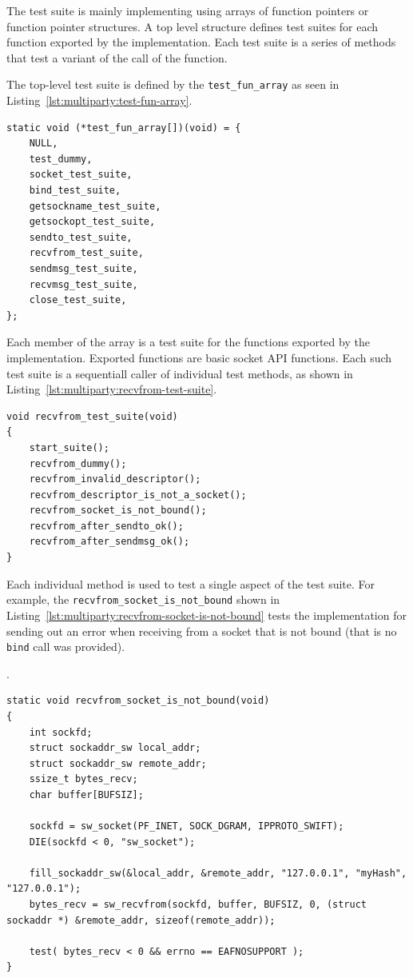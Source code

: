 The test suite is mainly implementing using arrays of function pointers or
function pointer structures. A top level structure defines test suites for
each function exported by the implementation. Each test suite is a series of
methods that test a variant of the call of the function.

The top-level test suite is defined by the \texttt{test\_fun\_array} as seen
in Listing~\ref{lst:multiparty:test-fun-array}.

\lstset{language=C,caption=Test Suite Top-Level
Array,label=lst:multiparty:test-fun-array}
\begin{lstlisting}
static void (*test_fun_array[])(void) = {
    NULL,
    test_dummy,
    socket_test_suite,
    bind_test_suite,
    getsockname_test_suite,
    getsockopt_test_suite,
    sendto_test_suite,
    recvfrom_test_suite,
    sendmsg_test_suite,
    recvmsg_test_suite,
    close_test_suite,
};
\end{lstlisting}

Each member of the array is a test suite for the functions exported by the
implementation. Exported functions are basic socket API functions. Each such
test suite is a sequentiall caller of individual test methods, as shown in
Listing~\ref{lst:multiparty:recvfrom-test-suite}.

\lstset{language=C,caption=Test Suite for recvfrom Call,label=lst:multiparty:recvfrom-test-suite}
\begin{lstlisting}
void recvfrom_test_suite(void)
{
    start_suite();
    recvfrom_dummy();
    recvfrom_invalid_descriptor();
    recvfrom_descriptor_is_not_a_socket();
    recvfrom_socket_is_not_bound();
    recvfrom_after_sendto_ok();
    recvfrom_after_sendmsg_ok();
}
\end{lstlisting}

Each individual method is used to test a single aspect of the test suite. For
example, the \texttt{recvfrom\_socket\_is\_not\_bound} shown in
Listing~\ref{lst:multiparty:recvfrom-socket-is-not-bound} tests the
implementation for sending out an error when receiving from a socket that is
not bound (that is no \texttt{bind} call was provided).

\lstset{language=C,caption=Basic Method for Testing recvfrom
Call,label=lst:multiparty:recvfrom-socket-is-not-bound}.
\begin{lstlisting}
static void recvfrom_socket_is_not_bound(void)
{
    int sockfd;
    struct sockaddr_sw local_addr;
    struct sockaddr_sw remote_addr;
    ssize_t bytes_recv;
    char buffer[BUFSIZ];

    sockfd = sw_socket(PF_INET, SOCK_DGRAM, IPPROTO_SWIFT);
    DIE(sockfd < 0, "sw_socket");

    fill_sockaddr_sw(&local_addr, &remote_addr, "127.0.0.1", "myHash", "127.0.0.1");
    bytes_recv = sw_recvfrom(sockfd, buffer, BUFSIZ, 0, (struct sockaddr *) &remote_addr, sizeof(remote_addr));

    test( bytes_recv < 0 && errno == EAFNOSUPPORT );
}
\end{lstlisting}

